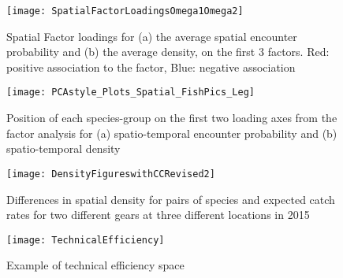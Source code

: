 \documentclass{nature}
\begin{document}
\begin{figure}
\begin{center}
	\texttt{[image: SpatialFactorLoadingsOmega1Omega2]}
	\label{fig:2}
	\caption{Spatial Factor loadings for (a) the average spatial encounter
		probability and (b) the average density,  on the first 3
		factors. Red: positive association to the factor, Blue:
		negative association}
\end{center}
\end{figure}

\begin{figure}
\begin{center}
	\texttt{[image: PCAstyle\_Plots\_Spatial\_FishPics\_Leg]}
	\label{fig:3}
	\caption{Position of each species-group on the first two loading axes from the
	factor analysis for (a) spatio-temporal encounter probability and (b)
	spatio-temporal density}
\end{center}
\end{figure}

\begin{figure}
\begin{center}
	\texttt{[image: DensityFigureswithCCRevised2]}
	\label{fig:4}
	\caption{Differences in spatial density for pairs of species and
		expected catch rates for two different gears at three different
	locations in 2015}
\end{center}
\end{figure}

\begin{figure}
\begin{center}
	\texttt{[image: TechnicalEfficiency]}
	\label{fig:5}
	\caption{Example of technical efficiency space}
\end{center}
\end{figure}
\end{document}
